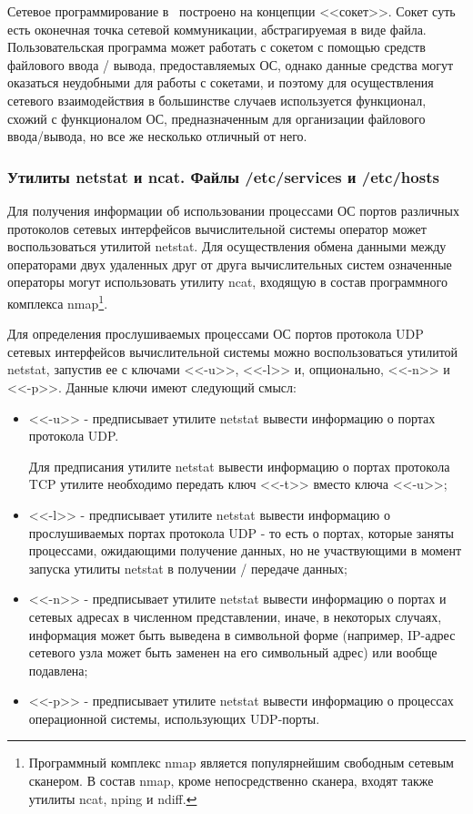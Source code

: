 	Сетевое программирование в \linux\ построено на концепции <<сокет>>. Сокет суть есть оконечная точка
	сетевой коммуникации, абстрагируемая в виде файла. Пользовательская программа может работать с сокетом
	с помощью средств файлового ввода / вывода, предоставляемых ОС, однако данные средства могут оказаться неудобными для
	работы с сокетами, и поэтому для осуществления сетевого взаимодействия в большинстве случаев используется
	функционал, схожий с функционалом ОС, предназначенным для организации файлового ввода/вывода,
	но все же несколько отличный от него.

\subsubsection{Утилиты netstat и ncat. Файлы /etc/services и /etc/hosts}

	Для получения информации об использовании процессами ОС портов различных протоколов сетевых интерфейсов вычислительной
	системы оператор может воспользоваться утилитой netstat. Для осуществления обмена данными между операторами двух удаленных друг
	от друга вычислительных систем означенные операторы могут использовать утилиту ncat, входящую в состав программного комплекса
	nmap\footnote{Программный комплекс nmap является популярнейшим свободным сетевым сканером. В состав nmap,
	кроме непосредственно сканера, входят также утилиты ncat, nping и ndiff.}.

	Для определения прослушиваемых процессами ОС портов протокола UDP сетевых интерфейсов вычислительной системы можно воспользоваться утилитой netstat,
	запустив ее с ключами <<-u>>, <<-l>> и, опционально, <<-n>> и <<-p>>. Данные ключи имеют следующий смысл:

	\begin{itemize}

		\item <<-u>> - предписывает утилите netstat вывести информацию о портах протокола UDP.

		Для предписания утилите netstat вывести информацию о портах протокола TCP утилите необходимо передать ключ <<-t>> вместо ключа <<-u>>;

		\item <<-l>> - предписывает утилите netstat вывести информацию о прослушиваемых портах протокола UDP - то есть о портах,
		которые заняты процессами, ожидающими получение данных, но не участвующими в момент запуска утилиты netstat в получении / передаче данных;

		\item <<-n>> - предписывает утилите netstat вывести информацию о портах и сетевых адресах в численном представлении, иначе, в некоторых случаях,
		информация может быть выведена в символьной форме (например, IP-адрес сетевого узла может быть заменен на его символьный адрес) или вообще подавлена;
		
		\item <<-p>> - предписывает утилите netstat вывести информацию о процессах операционной системы, использующих UDP-порты.

	\end{itemize}

